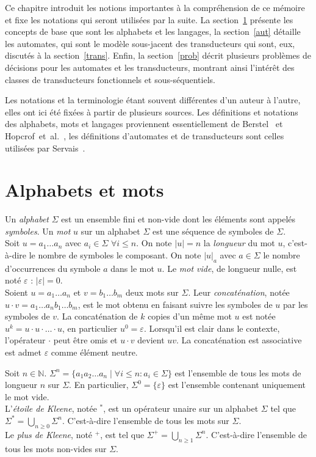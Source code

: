 \label{terminologie}

Ce chapitre introduit les notions importantes à la compréhension de ce mémoire et fixe les notations qui seront utilisées par la suite. La section~\ref{alph} présente les concepts de base que sont les alphabets et les langages, la section~\ref{aut} détaille les automates, qui sont le modèle sous-jacent des transducteurs qui sont, eux, discutés à la section~\ref{trans}. Enfin, la section~\ref{prob} décrit plusieurs problèmes de décisions pour les automates et les transducteurs, montrant ainsi l'intérêt des classes de transducteurs fonctionnels et sous-séquentiels.

Les notations et la terminologie étant souvent différentes d'un auteur à l'autre, elles ont ici été fixées à partir de plusieurs sources. Les définitions et notations des alphabets, mots et langages proviennent essentiellement de Berstel~\cite{Ber79} et Hopcrof~et~al.~\cite{Hop06}, les définitions d'automates et de transducteurs sont celles utilisées par Servais~\cite{Ser11}.

\section{Alphabets et mots}
\label{alph}

    Un \emph{alphabet} $\Sigma$ est un ensemble fini et non-vide dont les éléments sont appelés \emph{symboles}. Un \emph{mot} $u$ sur un alphabet $\Sigma$ est une séquence de symboles de $\Sigma$. \\
    Soit $u = a_1\ldots a_n$ avec $a_i \in \Sigma$ $\forall i \leq n$. On note $|u| = n$ la \emph{longueur} du mot $u$, c'est-à-dire le nombre de symboles le composant. On note $|u|_a$ avec $a \in \Sigma$ le nombre d'occurrences du symbole $a$ dans le mot $u$. Le \emph{mot vide}, de longueur nulle, est noté $\varepsilon$ : $|\varepsilon | = 0$. \\
    Soient $u = a_1\ldots a_n$ et $v = b_1\ldots b_m$ deux mots sur $\Sigma$. Leur \emph{concaténation}, notée $u\cdot v = a_1\ldots a_nb_1\ldots b_m$, est le mot obtenu en faisant suivre les symboles de $u$ par les symboles de $v$. La concaténation de $k$ copies d'un même mot $u$ est notée $u^k = u\cdot u\cdot \ldots \cdot u$, en particulier $u^0 = \varepsilon$. Lorsqu'il est clair dans le contexte, l'opérateur $\cdot$ peut être omis et $u \cdot v$ devient $uv$. La concaténation est associative est admet $\varepsilon$ comme élément neutre.
    
    Soit $n \in \mathbb{N}$. $\Sigma^n = \{a_1a_2\ldots a_n \mid \forall i \leq n : a_i \in \Sigma \}$ est l'ensemble de tous les mots de longueur $n$ sur $\Sigma$. En particulier, $\Sigma^0 = \{ \varepsilon \}$ est l'ensemble contenant uniquement le mot vide. \\
    L'\emph{étoile de Kleene}, notée $^*$, est un opérateur unaire sur un alphabet $\Sigma$ tel que $\Sigma^* = \bigcup_{n \geq 0} \Sigma^n$. C'est-à-dire l'ensemble de tous les mots sur $\Sigma$. \\
    Le \emph{plus de Kleene}, noté $^+$, est tel que $\Sigma^+ = \bigcup_{n \geq 1} \Sigma^n$. C'est-à-dire l'ensemble de tous les mots non-vides sur $\Sigma$. \\

